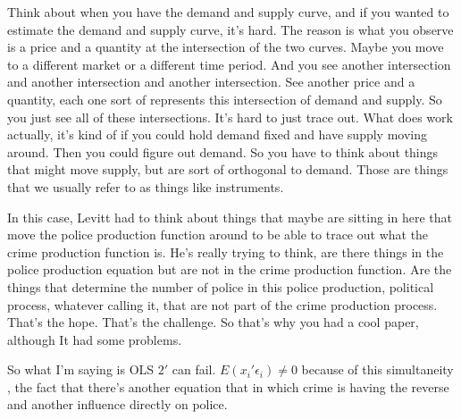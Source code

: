 \documentclass[11pt,a4paper]{amsart}
\theoremstyle{plain}
\theoremstyle{definition}
\begin{document}
 		 Think about when you have the demand and supply curve, and if you wanted to estimate the demand and supply curve, it's hard. The reason is what you observe is a price and a quantity at the intersection of the two curves. Maybe you move to a different market or a different time period. And you see another intersection and another intersection and another intersection. See another price and a quantity, each one sort of represents this intersection of demand and supply. So you just see all of these intersections. It's hard to just trace out. What does work actually, it's kind of if you could hold demand fixed and have supply moving around. Then you could figure out demand. So you have to think about things that might move supply, but are sort of orthogonal to demand. Those are things that we usually refer to as things like instruments.\par 
 		 In this case, Levitt had to think about things that maybe are sitting in here that move the police production function around to be able to trace out what the crime production function is. He's really trying to think, are there things in the police production equation but are not in the crime production function. Are the things that determine the number of police in this police production, political process, whatever calling it, that are not part of the crime production process. That's the hope. That's the challenge. So that's why you had a cool paper, although It had some problems.\par 
 		 So what I'm saying is OLS $2'$ can fail. $E(x_{i}'\epsilon_{i}) \ne 0$ because of this simultaneity , the fact that there's another equation that in which crime is having the reverse and another influence directly on police.
\end{document}
